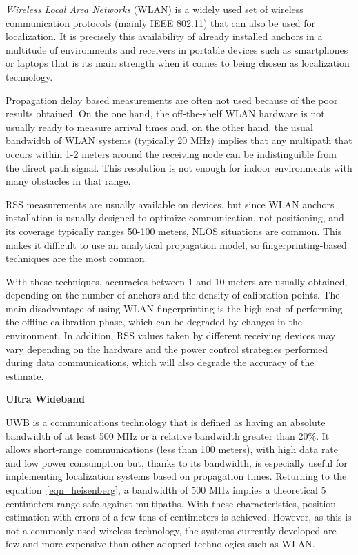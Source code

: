 \begin{description}
	\emph{Wireless Local Area Networks} (WLAN) is a widely used set of wireless communication protocols (mainly IEEE 802.11) that can also be used for localization. 
	It is precisely this availability of already installed anchors in a multitude of environments and receivers in portable devices such as smartphones or laptops that is its main strength when it comes to being chosen as localization technology.
	
	Propagation delay based measurements are often not used because of the poor results obtained. On the one hand, the off-the-shelf WLAN hardware is not usually ready to measure arrival times and, on the other hand, the usual bandwidth of WLAN systems (typically 20 MHz) implies that any multipath that occurs within 1-2 meters around the receiving node can be indistinguible from the direct path signal. This resolution is not enough for indoor environments with many obstacles in that range.
	
	RSS measurements are usually available on devices, but since WLAN anchors installation is usually designed to optimize communication, not positioning, and its coverage typically ranges 50-100 meters, NLOS situations are common. This makes it difficult to use an analytical propagation model, so fingerprinting-based techniques are the most common.
	
	With these techniques, accuracies between 1 and 10 meters are usually obtained, depending on the number of anchors and the density of calibration points.
	The main disadvantage of using WLAN fingerprinting is the high cost of performing the offline calibration phase, which can be degraded by changes in the environment.
	In addition, RSS values taken by different receiving devices may vary depending on the hardware and the power control strategies performed during data communications, which will also degrade the accuracy of the estimate.
	\item \textbf{Ultra Wideband}
	
	UWB is a communications technology that is defined as having an absolute bandwidth of at least 500 MHz or a relative bandwidth greater than 20\%. 
	It allows short-range communications (less than 100 meters), with high data rate and low power consumption but, thanks to its bandwidth, is especially useful for implementing localization systems based on propagation times. 
	Returning to the equation~\ref{eqn_heisenberg}, a bandwidth of 500 MHz implies a theoretical 5 centimeters range safe against multipaths.
	With these characteristics, position estimation with errors of a few tens of centimeters is achieved.
	However, as this is not a commonly used wireless technology, the systems currently developed are few and more expensive than other adopted technologies such as WLAN.
	

\end{description}
